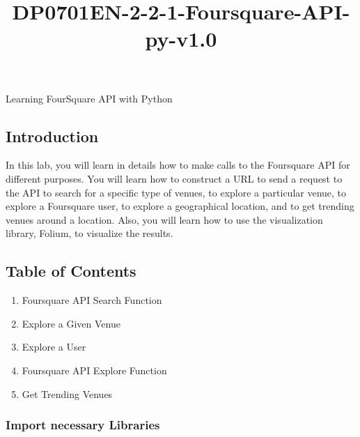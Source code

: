 \documentclass[11pt]{article}
\title{DP0701EN-2-2-1-Foursquare-API-py-v1.0}
\providecommand{\tightlist}{%
      \setlength{\itemsep}{0pt}\setlength{\parskip}{0pt}}
\begin{document}
    
    \maketitle
    
    

    
    Learning FourSquare API with Python

    

    \hypertarget{introduction}{%
\subsection{Introduction}\label{introduction}}

In this lab, you will learn in details how to make calls to the
Foursquare API for different purposes. You will learn how to construct a
URL to send a request to the API to search for a specific type of
venues, to explore a particular venue, to explore a Foursquare user, to
explore a geographical location, and to get trending venues around a
location. Also, you will learn how to use the visualization library,
Folium, to visualize the results.

    \hypertarget{table-of-contents}{%
\subsection{Table of Contents}\label{table-of-contents}}

\begin{enumerate}
\def\labelenumi{\arabic{enumi}.}
\tightlist
\item
  Foursquare API Search Function
\item
  Explore a Given Venue\\
\item
  Explore a User\\
\item
  Foursquare API Explore Function\\
\item
  Get Trending Venues
\end{enumerate}

    \hypertarget{import-necessary-libraries}{%
\subsubsection{Import necessary
Libraries}\label{import-necessary-libraries}}
\end{document}

